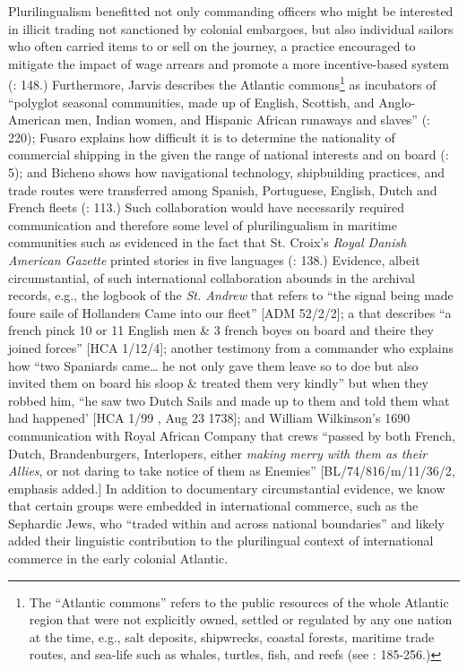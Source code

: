Plurilingualism benefitted not only commanding officers who might be interested in illicit trading not sanctioned by colonial embargoes, but also individual sailors who often carried items to  or sell on the journey, a practice encouraged to mitigate the impact of wage arrears and promote a more incentive-based system (\citealt{Jarvis2010}: 148.) Furthermore, Jarvis describes the Atlantic commons\footnote{The “Atlantic commons” refers to the public resources of the whole Atlantic region that were not explicitly owned, settled or regulated by any one nation at the time, e.g., salt deposits, shipwrecks, coastal forests, maritime trade routes, and sea-life such as whales, turtles, fish, and reefs (see \citealt{Jarvis2010}: 185-256.)} as incubators of “polyglot seasonal communities, made up of English, Scottish, and Anglo-American men, Indian women, and Hispanic African runaways and slaves” (\citeyear*{Jarvis2010}: 220); Fusaro explains how difficult it is to determine the nationality of commercial shipping in the  given the range of national interests and  on board (\citeyear*{Fusaro2015}: 5); and Bicheno shows how navigational technology, shipbuilding practices, and trade routes were transferred among Spanish, Portuguese, English, Dutch and French fleets (\citeyear*{Bicheno2012}: 113.) Such collaboration would have necessarily required communication and therefore some level of plurilingualism in maritime communities such as evidenced in the fact that St. Croix’s \textit{Royal Danish American Gazette} printed stories in five languages (\citealt{Jarvis2010}: 138.) Evidence, albeit circumstantial, of such international collaboration abounds in the archival records, e.g., the logbook of the \textit{St. Andrew} that refers to “the signal being made foure saile of Hollanders Came into our fleet” [ADM 52/2/2]; a  that describes “a french pinck 10 or 11 English men \& 3 french boyes on board and theire they joined forces” [HCA 1/12/4]; another testimony from a commander who explains how “two Spaniards came… he not only gave them leave so to doe but also invited them on board his sloop \& treated them very kindly” but when they robbed him, “he saw two Dutch Sails and made up to them and told them what had happened’ [HCA 1/99 , Aug 23 1738]; and William Wilkinson’s 1690 communication with Royal African Company that  crews “passed by both French, Dutch, Brandenburgers, Interlopers, either \textit{making merry with them as their Allies}, or not daring to take notice of them as Enemies” [BL/74/816/m/11/36/2, emphasis added.] In addition to documentary circumstantial evidence, we know that certain groups were embedded in international commerce, such as the Sephardic Jews, who “traded within and across national boundaries” \citep[20]{Jarvis2010} and likely added their linguistic contribution to the plurilingual context of international commerce in the early colonial Atlantic. 

